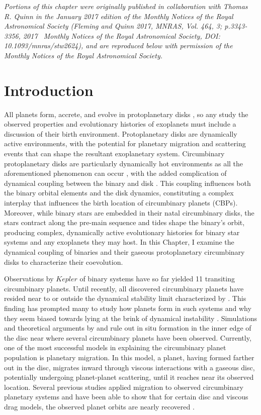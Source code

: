 \textit{Portions of this chapter were originally published in collaboration with Thomas R. Quinn in the January 2017 edition of the Monthly Notices of the Royal Astronomical Society (Fleming and Quinn 2017, MNRAS, Vol. 464, 3; p.3343-3356, 2017 \textcopyright \ Monthly Notices of the Royal Astronomical Society, DOI: 10.1093/mnras/stw2624), and are reproduced below with permission of the Monthly Notices of the Royal Astronomical Society.}

\section{Introduction}

All planets form, accrete, and evolve in protoplanetary disks \citep[e.g.][]{Lin1996,Nelson2000,Papaloizou2006,Rogers2011,Bodenheimer2014}, so any study the observed properties and evolutionary histories of exoplanets must include a discussion of their birth environment.  Protoplanetary disks are dynamically active environments, with the potential for planetary migration and scattering events that can shape the resultant exoplanetary system.  Circumbinary protoplanetary disks are particularly dynamically hot environments as all the aforementioned phenomenon can occur \citep[e.g.][]{Pierens2013}, with the added complication of dynamical coupling between the binary and disk \citep{Papaloizou2001}.  This coupling influences both the binary orbital elements and the disk dynamics, constituting a complex interplay that influences the birth location of circumbinary planets (CBPs).  Moreover, while binary stars are embedded in their natal circumbinary disks, the stars contract along the pre-main sequence and tides shape the binary's orbit, producing complex, dynamically active evolutionary histories for binary star systems and any exoplanets they may host.  In this Chapter, I examine the dynamical coupling of binaries and their gaseous protoplanetary circumbinary disks to characterize their coevolution.

Observations by $Kepler$ of binary systems have so far yielded 11 transiting circumbinary planets.  Until recently, all discovered circumbinary planets have resided near to or outside the dynamical stability limit characterized by \citet{Dvorak1986,Holman1999}.  This
finding has prompted many to study how planets form in such systems and why they seem biased towards lying at the brink of dynamical instability \citep{Welsh2014,Pierens2013}.  Simulations and theoretical arguments by \citet{Pelupessy2013} and \citet{Bromley2015} rule out in situ formation
in the inner edge of the disc near where several circumbinary planets have been observed.  Currently, one of the most successful models in explaining the circumbinary planet population is planetary migration.  
In this model, a planet, having formed farther out in the disc, migrates inward through viscous interactions with a gaseous disc, potentially undergoing planet-planet scattering, until it reaches near its observed location.  Several previous studies applied migration to observed circumbinary planetary systems and have been able to show that for certain disc and viscous drag models, the observed planet orbits are nearly recovered \citep[e.g.][]{Kley2014,Kley2015,Pierens2007,Pierens2013}.

